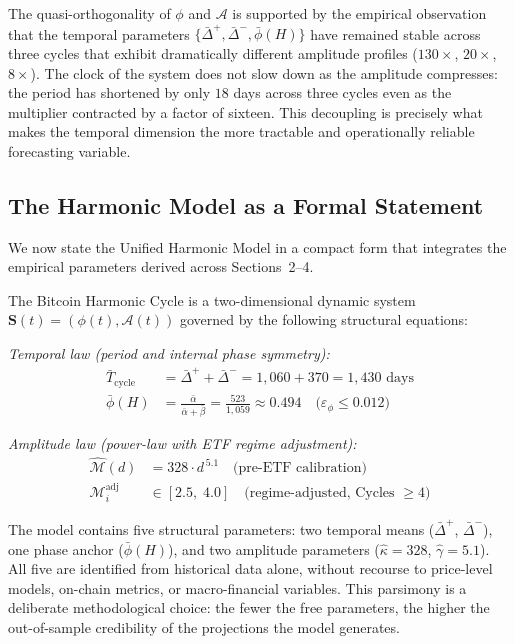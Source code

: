 The quasi-orthogonality of $\phi$ and $\mathcal{A}$ is supported by the
empirical observation that the temporal parameters $\{\bar{\Delta}^{+},
\bar{\Delta}^{-}, \bar{\phi}(H)\}$ have remained stable across three cycles
that exhibit dramatically different amplitude profiles ($130\times$, $20\times$,
$8\times$). The clock of the system does not slow down as the amplitude
compresses: the period has shortened by only $18$ days across three cycles even
as the multiplier contracted by a factor of sixteen. This decoupling is
precisely what makes the temporal dimension the more tractable and operationally
reliable forecasting variable.

\subsection{The Harmonic Model as a Formal Statement}

We now state the Unified Harmonic Model in a compact form that integrates
the empirical parameters derived across Sections~2--4.

\begin{definition}
The Bitcoin Harmonic Cycle is a two-dimensional dynamic system
$\mathbf{S}(t) = (\phi(t), \mathcal{A}(t))$ governed by the following
structural equations:

\medskip
\textit{Temporal law (period and internal phase symmetry):}
\begin{align}
  \bar{T}_{\text{cycle}} &= \bar{\Delta}^{+} + \bar{\Delta}^{-}
    = 1{,}060 + 370 = 1{,}430 \text{ days} \label{eq:period_law} \\[4pt]
  \bar{\phi}(H) &= \frac{\bar{\alpha}}{\bar{\alpha} + \bar{\beta}}
    = \frac{523}{1{,}059} \approx 0.494
    \quad \bigl(\varepsilon_\phi \leq 0.012\bigr) \label{eq:phase_law}
\end{align}

\textit{Amplitude law (power-law with ETF regime adjustment):}
\begin{align}
  \hat{\mathcal{M}}(d) &= 328 \cdot d^{\,5.1}
    \quad \text{(pre-ETF calibration)} \label{eq:amp_law_pre} \\[4pt]
  \mathcal{M}_i^{\text{adj}} &\in [2.5,\; 4.0]
    \quad \text{(regime-adjusted, Cycles } \geq 4\text{)} \label{eq:amp_law_etf}
\end{align}
\end{definition}

The model contains five structural parameters: two temporal means
($\bar{\Delta}^{+}$, $\bar{\Delta}^{-}$), one phase anchor
($\bar{\phi}(H)$), and two amplitude parameters ($\hat{\kappa} = 328$,
$\hat{\gamma} = 5.1$). All five are identified from historical data alone,
without recourse to price-level models, on-chain metrics, or macro-financial
variables. This parsimony is a deliberate methodological choice: the fewer the
free parameters, the higher the out-of-sample credibility of the projections
the model generates.

